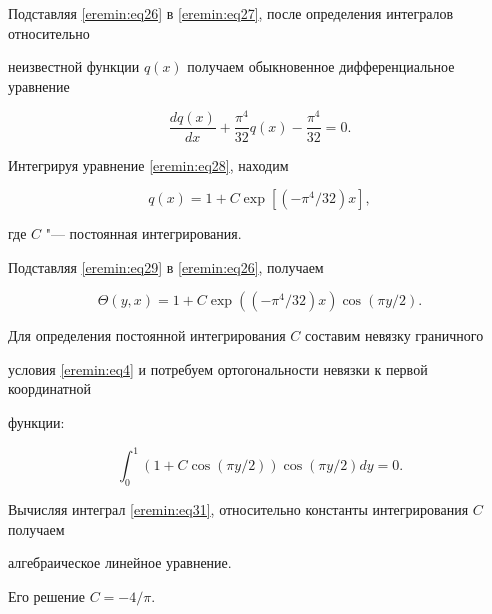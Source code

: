 Подставляя \eqref{eremin:eq26} в \eqref{eremin:eq27}, после определения интегралов относительно

неизвестной функции $q(x)$ получаем обыкновенное дифференциальное уравнение

\begin{equation}

\label{eremin:eq28}

\frac{dq(x)}{dx}+\frac{\pi ^4}{32}q(x)-\frac{\pi^4}{32}=0.

\end{equation}

Интегрируя уравнение \eqref{eremin:eq28}, находим

\begin{equation}

\label{eremin:eq29}

q(x)=1+C\exp\left[\left(-\pi^4/32\right)x\right],

\end{equation}

где $C$ "--- постоянная интегрирования.



Подставляя \eqref{eremin:eq29} в \eqref{eremin:eq26}, получаем

\begin{equation}

\label{eremin:eq30}

\Theta (y,x)=1+C\exp \left((-\pi^4/32 )x \right)\cos (\pi y/2).

\end{equation}



Для определения постоянной интегрирования $C$ составим невязку граничного

условия \eqref{eremin:eq4} и потребуем ортогональности невязки к первой координатной

функции:

\begin{equation}

\label{eremin:eq31}

\int _0^1 \left(1+C\cos (\pi y/2) \right)\cos (\pi y/2)dy=0.

\end{equation}



Вычисляя интеграл \eqref{eremin:eq31}, относительно константы интегрирования $C$ получаем

алгебраическое линейное уравнение. 

Его решение $C=-4/\pi $.



